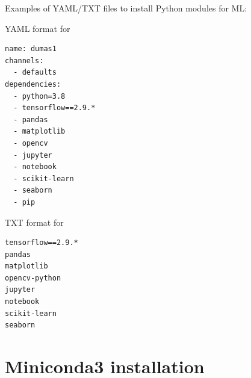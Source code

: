 \documentclass[10pt,serif,mathserif,compress,hyperref={colorlinks}]{beamer}
\begin{document}
\begin{frame}[fragile]

\hspace*{-5mm}Examples of YAML/TXT files to install Python modules for ML:\\[-5mm]
  \hspace*{5mm}\begin{minipage}[t]{.35\linewidth}
    \begin {bclogo}[noborder=true, couleur=gray!50, couleurBarre=Chocolate, logo=\bctrombone, marge=0, margeG=-.8]
    {\small YAML format for }
    \begin{verbatim}
name: dumas1
channels:
  - defaults
dependencies:
  - python=3.8
  - tensorflow==2.9.*
  - pandas
  - matplotlib
  - opencv
  - jupyter
  - notebook
  - scikit-learn
  - seaborn
  - pip
\end{verbatim}
    \end{bclogo}
  \end{minipage}
\hspace*{25mm}\begin{minipage}[t]{.3\linewidth}
    \begin {bclogo}[noborder=true, couleur=gray!50, couleurBarre=Chocolate, logo=\bctrombone, marge=0, margeG=-.8]
    {\small TXT format for }
\begin{verbatim}
tensorflow==2.9.*
pandas
matplotlib
opencv-python
jupyter
notebook
scikit-learn
seaborn
\end{verbatim}
    \end{bclogo}
    \end{minipage}  

\end{frame}

\section{Miniconda3 installation}
\end{document}
